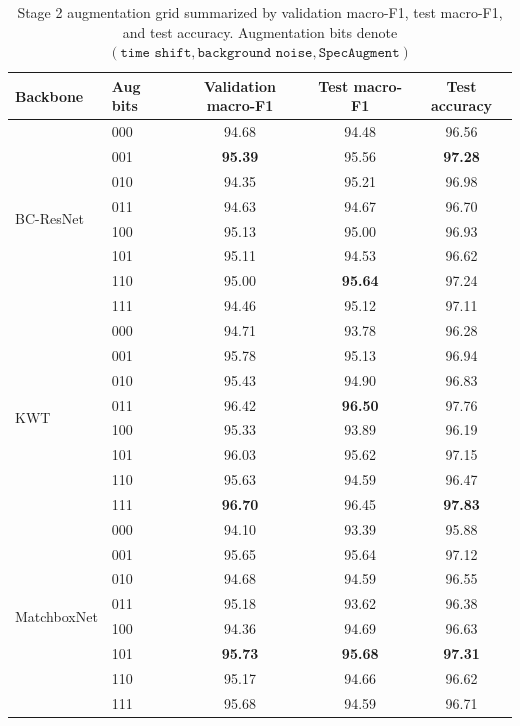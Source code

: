 \documentclass[11pt]{article}
\begin{document}
\begin{table}[t!]
\centering
\caption{Stage 2 augmentation grid summarized by validation macro-F1, test macro-F1, and test accuracy. Augmentation bits denote \((\texttt{time shift}, \texttt{background noise}, \texttt{SpecAugment})\)}
\label{tab:stage2-results}
\smallskip
\small
\begin{tabular}{@{}llccc@{}}
\toprule
\textbf{Backbone} & \textbf{Aug bits} & \textbf{Validation macro-F1} & \textbf{Test macro-F1} & \textbf{Test accuracy}\\
\midrule
\multirow{8}{*}{BC-ResNet}
 & 000 & 94.68 & 94.48 & 96.56 \\
 & 001 & \textbf{95.39} & 95.56 & \textbf{97.28} \\
 & 010 & 94.35 & 95.21 & 96.98 \\
 & 011 & 94.63 & 94.67 & 96.70 \\
 & 100 & 95.13 & 95.00 & 96.93 \\
 & 101 & 95.11 & 94.53 & 96.62 \\
 & 110 & 95.00 & \textbf{95.64} & 97.24 \\
 & 111 & 94.46 & 95.12 & 97.11 \\
\midrule
\multirow{8}{*}{KWT}
 & 000 & 94.71 & 93.78 & 96.28 \\
 & 001 & 95.78 & 95.13 & 96.94 \\
 & 010 & 95.43 & 94.90 & 96.83 \\
 & 011 & 96.42 & \textbf{96.50} & 97.76 \\
 & 100 & 95.33 & 93.89 & 96.19 \\
 & 101 & 96.03 & 95.62 & 97.15 \\
 & 110 & 95.63 & 94.59 & 96.47 \\
 & 111 & \textbf{96.70} & 96.45 & \textbf{97.83} \\

\midrule
\multirow{8}{*}{MatchboxNet}
 & 000 & 94.10 & 93.39 & 95.88 \\
 & 001 & 95.65 & 95.64 & 97.12 \\
 & 010 & 94.68 & 94.59 & 96.55 \\
 & 011 & 95.18 & 93.62 & 96.38 \\
 & 100 & 94.36 & 94.69 & 96.63 \\
 & 101 & \textbf{95.73} & \textbf{95.68} & \textbf{97.31} \\
 & 110 & 95.17 & 94.66 & 96.62 \\
 & 111 & 95.68 & 94.59 & 96.71 \\
\bottomrule
\end{tabular}
\end{table}
\end{document}
